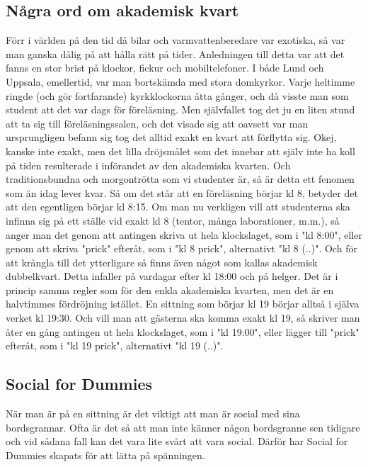 
\newpage

\enlargethispage{1.0cm}
\subsection*{Några ord om akademisk kvart}

{\fontsize{9}{9}\selectfont 
Förr i världen på den tid då bilar och varmvattenberedare var exotiska, 
så var man ganska dålig på att hålla rätt på tider. 
Anledningen till detta var att det fanns en stor brist på klockor, fickur och mobiltelefoner. 
I både Lund och Uppsala, emellertid, var man bortskämda med stora domkyrkor. 
Varje heltimme ringde (och gör fortfarande) kyrkklockorna åtta gånger, 
och då visste man som student att det var dags för föreläsning. 
Men självfallet tog det ju en liten stund att ta sig till föreläsningssalen, 
och det visade sig att oavsett var man ursprungligen befann sig tog det alltid exakt en kvart att förflytta sig. 
Okej, kanske inte exakt, men det lilla dröjsmålet som det innebar att själv inte ha koll på tiden resulterade i införandet av den akademiska kvarten.
Och traditionsbundna och morgontrötta som vi studenter är, 
så är detta ett fenomen som än idag lever kvar. Så om det står att en föreläsning börjar kl 8, 
betyder det att den egentligen börjar kl 8:15. 
Om man nu verkligen vill att studenterna ska infinna sig på ett ställe vid exakt kl 8 
(tentor, många laborationer, m.m.), så anger man det genom att antingen skriva ut hela klockslaget, 
som i "kl 8:00", eller genom att skriva "prick" efteråt, som i "kl 8 prick", alternativt "kl 8 (..)". 
Och för att krångla till det ytterligare så finns även något som kallas akademisk dubbelkvart. 
Detta infaller på vardagar efter kl 18:00 och på helger. 
Det är i princip samma regler som för den enkla akademiska kvarten, 
men det är en halvtimmes fördröjning istället. 
En sittning som börjar kl 19 börjar alltså i själva verket kl 19:30. 
Och vill man att gästerna ska komma exakt kl 19, 
så skriver man åter en gång antingen ut hela klockslaget, 
som i "kl 19:00", eller lägger till "prick" efteråt, som i "kl 19 prick", alternativt "kl 19 (..)".
}

\newpage


\subsection*{Social for Dummies}
När man är på en sittning är det viktigt att man är social med sina bordsgrannar. 
Ofta är det så att man inte känner någon bordsgranne sen tidigare och vid sådana 
fall kan det vara lite svårt att vara social. Därför har Social for Dummies 
skapats för att lätta på spänningen.
\\

